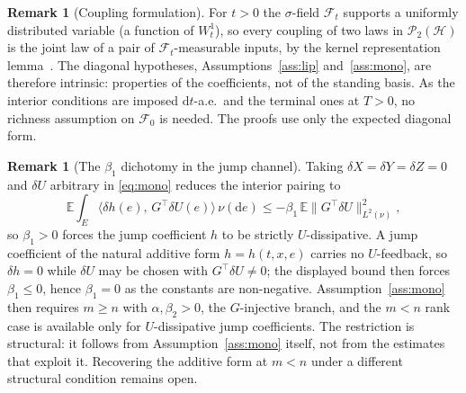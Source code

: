 \documentclass[preprint,12pt]{elsarticle}
\newcommand{\E}{\mathbb{E}}
\newcommand{\F}{\mathcal{F}}
\newcommand{\diff}{\mathrm{d}}
\newcommand{\inner}[2]{\langle #1,\,#2\rangle}
\newcommand{\Lnu}{L^2(\nu)}
\newcommand{\Gstar}{G^{\!\top}}
\newcommand{\Lnorm}[1]{\lVert #1\rVert_{\Lnu}}
\numberwithin{equation}{section}
\theoremstyle{plain}
\theoremstyle{definition}
\theoremstyle{\PaperRemarkStyle}
\newtheorem{remark}[theorem]{Remark}
\begin{document}
\begin{remark}[Coupling formulation]\label{rem:intrinsic}
For $t>0$ the $\sigma$-field $\F_t$ supports a uniformly distributed variable (a
function of $W^1_t$), so every coupling of two laws in $\mathcal P_2(\mathcal H)$ is
the joint law of a pair of $\F_t$-measurable
inputs, by the kernel representation lemma~\cite[Lemma~4.22]{Kallenberg}. The diagonal hypotheses,
Assumptions~\ref{ass:lip} and~\ref{ass:mono}, are therefore intrinsic: properties of
the coefficients, not of the standing basis. As the interior conditions are imposed
$\diff t$-a.e.\ and the terminal ones at $T>0$, no richness assumption on $\F_0$ is
needed. The proofs use only the expected diagonal form.
\end{remark}
\begin{remark}[The $\beta_1$ dichotomy in the jump channel]\label{rem:beta1-dich}
Taking $\delta X=\delta Y=\delta Z=0$ and $\delta U$ arbitrary in \eqref{eq:mono} reduces the
interior pairing to
\[
\E\int_E\inner{\delta h(e)}{\Gstar\delta U(e)}\,\nu(\diff e)
\le-\beta_1\,\E\Lnorm{\Gstar\delta U}^2 ,
\]
so $\beta_1>0$ forces the jump coefficient $h$ to be strictly $U$-dissipative. A jump
coefficient of the natural additive form $h=h(t,x,e)$ carries no $U$-feedback, so
$\delta h=0$ while $\delta U$ may be chosen with $\Gstar\delta U\neq0$; the displayed bound
then forces $\beta_1\le0$, hence $\beta_1=0$ as the constants are non-negative.
Assumption~\ref{ass:mono} then requires $m\ge n$ with $\alpha,\beta_2>0$, the
$G$-injective branch, and the $m<n$ rank case is available only for $U$-dissipative jump
coefficients.
The restriction is structural: it follows from Assumption~\ref{ass:mono} itself, not from
the estimates that exploit it. Recovering the additive form at $m<n$ under a different
structural condition remains open.
\end{remark}
\end{document}
